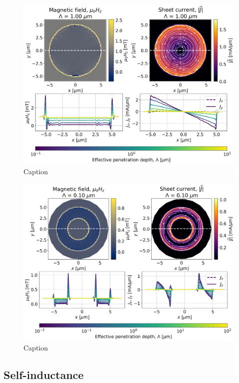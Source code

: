 \documentclass[preprint,12pt]{elsarticle}
\begin{document}
\begin{figure}
    \centering
    \includegraphics[scale=.40]{examples/images/disk/disk_uniform_field.png}
    \caption{Caption}
    \label{fig:disk_uniform_field}
\end{figure}

\begin{figure}
    \centering
    \includegraphics[scale=.40]{examples/images/ring/circular_ring_uniform_field.png}
    \caption{Caption}
    \label{fig:ring_uniform_field}
\end{figure}

\subsection{Self-inductance}
\label{section:examples:inductance}
\end{document}
